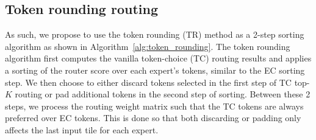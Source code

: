 








\subsection{Token rounding routing}\label{sec:tr}

As such, we propose to use the token rounding (TR) method as a 2-step sorting algorithm as shown in Algorithm~\ref{alg:token_rounding}. The token rounding algorithm first computes the vanilla token-choice (TC) routing results and applies a sorting of the router score over each expert's tokens, similar to the EC sorting step. We then choose to either discard tokens selected in the first step of TC top-$K$ routing or pad additional tokens in the second step of sorting. Between these 2 steps, we process the routing weight matrix such that the TC tokens are always preferred over EC tokens. This is done so that both discarding or padding only affects the last input tile for each expert.

